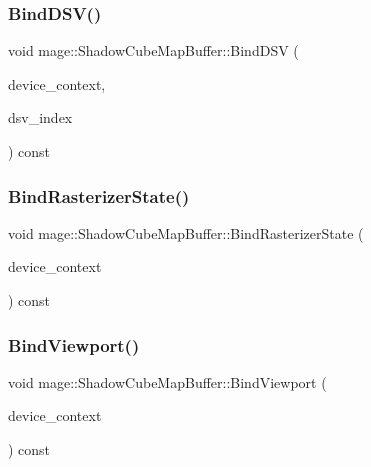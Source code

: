 \subsubsection{\texorpdfstring{Bind\+D\+S\+V()}{BindDSV()}}
{\footnotesize\ttfamily void mage\+::\+Shadow\+Cube\+Map\+Buffer\+::\+Bind\+D\+SV (\begin{DoxyParamCaption}\item[{I\+D3\+D11\+Device\+Context2 $\ast$}]{device\+\_\+context,  }\item[{size\+\_\+t}]{dsv\+\_\+index }\end{DoxyParamCaption}) const\hspace{0.3cm}{\ttfamily [noexcept]}}

\hypertarget{structmage_1_1_shadow_cube_map_buffer_a8bb32b390a2488f00e0b16e4f8879f25}{}\label{structmage_1_1_shadow_cube_map_buffer_a8bb32b390a2488f00e0b16e4f8879f25} 
\subsubsection{\texorpdfstring{Bind\+Rasterizer\+State()}{BindRasterizerState()}}
{\footnotesize\ttfamily void mage\+::\+Shadow\+Cube\+Map\+Buffer\+::\+Bind\+Rasterizer\+State (\begin{DoxyParamCaption}\item[{I\+D3\+D11\+Device\+Context2 $\ast$}]{device\+\_\+context }\end{DoxyParamCaption}) const\hspace{0.3cm}{\ttfamily [noexcept]}}

\hypertarget{structmage_1_1_shadow_cube_map_buffer_abc8eb7d1ebf0cafb8b626bc5cc7c4c71}{}\label{structmage_1_1_shadow_cube_map_buffer_abc8eb7d1ebf0cafb8b626bc5cc7c4c71} 
\subsubsection{\texorpdfstring{Bind\+Viewport()}{BindViewport()}}
{\footnotesize\ttfamily void mage\+::\+Shadow\+Cube\+Map\+Buffer\+::\+Bind\+Viewport (\begin{DoxyParamCaption}\item[{I\+D3\+D11\+Device\+Context2 $\ast$}]{device\+\_\+context }\end{DoxyParamCaption}) const\hspace{0.3cm}{\ttfamily [noexcept]}}

